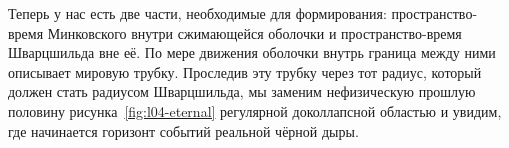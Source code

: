 Теперь у нас есть две части, необходимые для формирования: пространство-время Минковского внутри сжимающейся оболочки и пространство-время Шварцшильда вне её. По мере движения оболочки внутрь граница между ними описывает мировую трубку. Проследив эту трубку через тот радиус, который должен стать радиусом Шварцшильда, мы заменим нефизическую прошлую половину рисунка~\ref{fig:l04-eternal} регулярной доколлапсной областью и увидим, где начинается горизонт событий реальной чёрной дыры.
